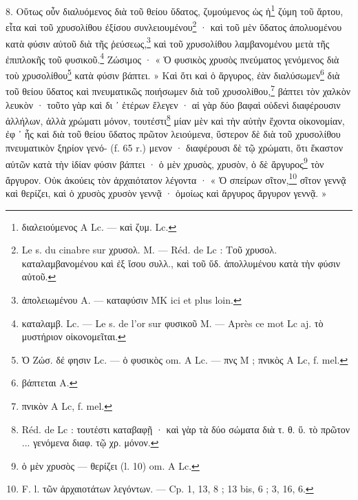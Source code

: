 \documentclass[a4paper, 11pt, oneside, polutonikogreek, french]{article}
\begin{document}
8. Οὕτως οὖν διαλυόμενος διὰ τοῦ θείου ὕδατος, ζυμούμενος ὡς ἡ\footnote{διαλειούμενος A Lc. --- καὶ ζυμ. Lc.} ζύμη τοῦ ἄρτου, εἶτα καὶ τοῦ χρυσολίθου ἐξίσου συνλειουμένου\footnote{Le s. du cinabre sur χρυσολ. M. --- Réd. de Lc : Τοῦ χρυσολ. καταλαμβανομένου καὶ ἐξ ἴσου συλλ., καὶ τοῦ ὕδ. ἀπολλυμένου κατὰ τὴν φύσιν αὐτοῦ.} · καὶ τοῦ μὲν ὕδατος ἀπολυομένου κατὰ φύσιν αὐτοῦ διὰ τῆς ῥεύσεως,\footnote{ἀπολειωμένου A. --- καταφύσιν MK ici et plus loin.} καὶ τοῦ χρυσολίθου λαμβανομένου μετὰ τῆς ἐπιπλοκῆς τοῦ φυσικοῦ.\footnote{καταλαμβ. Lc. --- Le s. de l'or sur φυσικοῦ M. --- Après ce mot Lc aj. τὸ μυστήριον οἰκονομεῖται.} Ζώσιμος · « Ὁ φυσικὸς χρυσὸς πνεύματος γενόμενος διὰ τοὺ χρυσολίθου\footnote{Ὁ Ζώσ. δέ φησιν Lc. --- ὁ φυσικὸς om. A Lc. --- πνς M ; πνικὸς A Lc, f. mel.} κατὰ φύσιν βάπτει. » Καὶ ὅτι καὶ ὁ ἄργυρος, ἐὰν διαλύσωμεν\footnote{βάπτεται A.} διὰ τοῦ θείου ὕδατος καὶ πνευματικῶς ποιήσωμεν διὰ τοῦ χρυσολίθου,\footnote{πνικὸν A Lc, f. mel.} βάπτει τὸν χαλκὸν λευκὸν · τοῦτο γὰρ καὶ δι ᾽ ἑτέρων ἔλεγεν · αἱ γὰρ δύο βαφαὶ οὐδενὶ διαφέρουσιν ἀλλήλων, ἀλλὰ χρώματι μόνον, τουτέστι\footnote{Réd. de Lc : τουτέστι καταβαφῇ · καὶ γὰρ τὰ δύο σώματα διὰ τ. θ. ὕ. τὸ πρῶτον ... γενόμενα διαφ. τῷ χρ. μόνον.} μίαν μὲν καὶ τὴν αὐτὴν ἔχοντα οἰκονομίαν, ἐφ ᾽ ἧς καὶ διὰ τοῦ θείου ὕδατος πρῶτον λειούμενα, ὕστερον δὲ διὰ τοῦ χρυσολίθου πνευματικὸν ξηρίον γενό- (f. 65 r.) μενον · διαφέρουσι δὲ τῷ χρώματι, ὅτι ἕκαστον αὐτῶν κατὰ τὴν ἰδίαν φύσιν βάπτει · ὁ μὲν χρυσὸς, χρυσὸν, ὁ δὲ ἄργυρος\footnote{ὁ μὲν χρυσὸς --- θερίζει (l. 10) om. A Lc.} τὸν ἄργυρον. Οὐκ ἀκούεις τὸν ἀρχαιότατον λέγοντα · « Ὁ σπείρων σῖτον,\footnote{F. l. τῶν ἀρχαιοτάτων λεγόντων. --- Cp. 1, 13, 8 ; 13 bis, 6 ; 3, 16, 6.} σῖτον γεννᾷ καὶ θερίζει, καὶ ὁ χρυσὸς χρυσὸν γεννᾷ · ὁμοίως καὶ ἄργυρος ἄργυρον γεννᾷ. »
\end{document}
